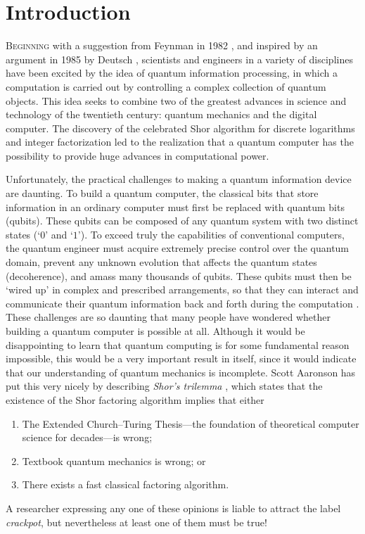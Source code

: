 %
\chapter{Introduction}\label{ch:introduction}
\lettrine{B}{eginning} with a suggestion from Feynman in 1982 \cite{feynman_1982}, and inspired by an argument in 1985 by Deutsch \cite{deutsch_1985}, scientists and engineers in a variety of disciplines have been excited by the idea of quantum information processing, in which a computation is carried out by controlling a complex collection of quantum objects. This idea seeks to combine two of the greatest advances in science and technology of the twentieth century: quantum mechanics and the digital computer.
The discovery of the celebrated Shor algorithm \cite{shor_algorithms_1994} for discrete logarithms and integer factorization led to the realization that a quantum computer has the possibility to provide huge advances in computational power.

Unfortunately, the practical challenges to making a quantum information device are daunting. To build a quantum computer, the classical bits that store information in an ordinary computer must first be replaced with quantum bits (qubits). These qubits can be composed of any quantum system with two distinct states (`$0$' and `$1$'). To exceed truly the capabilities of conventional computers, the quantum engineer must acquire extremely precise control over the quantum domain, prevent any unknown evolution that affects the quantum states (decoherence), and amass many thousands of qubits. These qubits must then be `wired up' in complex and prescribed arrangements, so that they can interact and communicate their quantum information back and forth during the computation \cite{schoelkopf_wiring_2008}. These challenges are so daunting that many people have wondered whether building a quantum computer is possible at all. Although it would be disappointing to learn that quantum computing is for some fundamental reason impossible, this would be a very important result in itself, since it would indicate that our understanding of quantum mechanics is incomplete. Scott Aaronson has put this very nicely by describing \emph{Shor's trilemma} \cite{aaronson_thesis}, which states that the existence of the Shor factoring algorithm implies that either
\begin{enumerate}
    \item The Extended Church--Turing Thesis---the foundation of theoretical computer science for decades---is wrong\label{it:churchturing};
    \item Textbook quantum mechanics is wrong; or
    \item There exists a fast classical factoring algorithm.
\end{enumerate}
A researcher expressing any one of these opinions is liable to attract the label \emph{crackpot}, but nevertheless at least one of them must be true!

